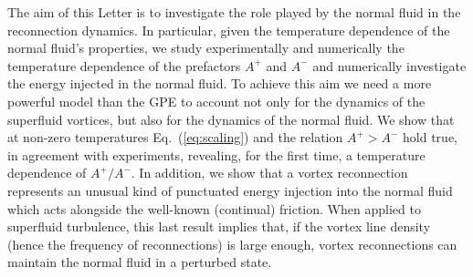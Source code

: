 \documentclass[
  reprint,
superscriptaddress,
 amsmath,amssymb,
 aps,
prb,
]{revtex4-2}
\begin{document}
The aim of this Letter is to investigate the role played by the normal fluid in the reconnection dynamics. In particular, given the temperature dependence of the normal fluid's properties, we study experimentally and numerically the temperature dependence of the prefactors $A^+$ and $A^-$ and numerically investigate the energy injected in the normal fluid. 
%
To achieve this aim we need a more powerful model than the GPE to account not only for the dynamics of the
superfluid vortices, but also for the dynamics of the normal fluid. 
We show that at non-zero temperatures Eq.~(\ref{eq:scaling}) and the
relation $A^+>A^-$ hold true, in agreement with experiments, revealing, for the 
first time, a temperature dependence of $A^+/A^-$. In addition, we
show that a vortex
reconnection represents an unusual kind of
punctuated energy injection into the normal fluid which acts alongside
the well-known (continual) friction.
When applied to superfluid turbulence, this last result implies that,
if the vortex line density (hence the frequency of reconnections) is large enough, vortex reconnections can maintain the normal fluid in a perturbed state.
\end{document}
